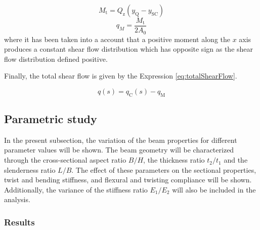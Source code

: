 



\begin{equation}\label{eq:momentDueToQz}
  M_\mathrm{t} = Q_\mathrm{z} (y_{\mathrm{Q}} - y_\mathrm{SC})
\end{equation}
%
\begin{equation}\label{eq:constantShearFlow}
  q_M = \frac{M_\mathrm{t}}{2 A_0}
\end{equation}
%
where it has been taken into a account that a positive moment along the $x$ axis produces a constant shear flow distribution which has opposite sign as the shear flow distribution defined positive.

Finally, the total shear flow is given by the Expression \ref{eq:totalShearFlow}.

\begin{equation}\label{eq:totalShearFlow}
  q(s) = q_\mathrm{C}(s) - q_\mathrm{M}
\end{equation}

\subsection{Parametric study} \label{subsec:parametricStudy} %

In the present subsection, the variation of the beam properties for different parameter values will be shown. The beam geometry will be characterized through the cross-sectional aspect ratio $B/H$, the thickness ratio $t_2/t_1$ and the slenderness ratio $L/B$. The effect of these parameters on the sectional properties, twist and bending stiffness, and flexural and twisting compliance will be shown. Additionally, the variance of the stiffness ratio $E_1/E_2$ will also be included in the analysis.

\subsubsection{Results} \label{subsubsec:results_parametricStudy}

